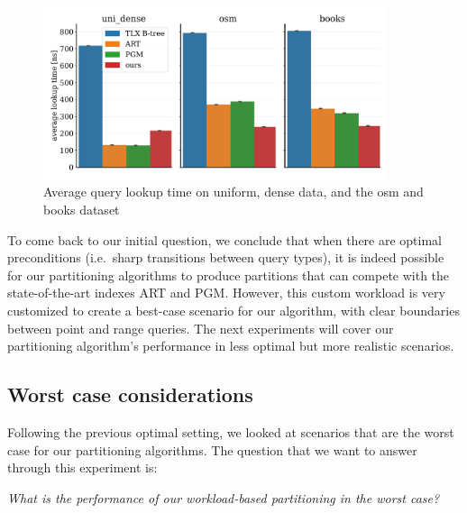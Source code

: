 \begin{figure}
    \centering
    \includegraphics[width=0.9\textwidth]{figures/poc_times.pdf}
    \caption[uniform, osm and books lookup performance after sharp boundary sampling]{Average query lookup time on uniform, dense data, and the osm and books dataset}
    \label{fig:poc_times}
\end{figure}

To come back to our initial question, we conclude that when there are optimal preconditions (i.e.~sharp transitions between query types), it is indeed possible for our partitioning algorithms to produce partitions that can compete with the state-of-the-art indexes ART and PGM. However, this custom workload is very customized to create a best-case scenario for our algorithm, with clear boundaries between point and range queries. The next experiments will cover our partitioning algorithm's performance in less optimal but more realistic scenarios.

\subsection{Worst case considerations}
Following the previous optimal setting, we looked at scenarios that are the worst case for our partitioning algorithms. The question that we want to answer through this experiment is:

\begin{center}
    \textit{What is the performance of our workload-based partitioning in the worst case?}
\end{center}

